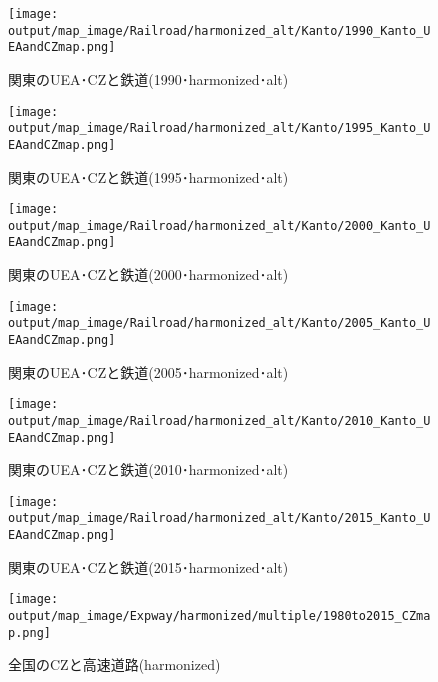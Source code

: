 \documentclass{ltjsarticle}
\begin{document}
\begin{figure}[pbth]
  \centering
  \texttt{[image: output/map\_image/Railroad/harmonized\_alt/Kanto/1990\_Kanto\_UEAandCZmap.png]}
  \caption{\label{altham:1990:KanCZandUEA:Rail}関東のUEA･CZと鉄道(1990･harmonized･alt)}
\end{figure}


\begin{figure}[pbth]
  \centering
  \texttt{[image: output/map\_image/Railroad/harmonized\_alt/Kanto/1995\_Kanto\_UEAandCZmap.png]}
  \caption{\label{altham:1995:KanCZandUEA:Rail}関東のUEA･CZと鉄道(1995･harmonized･alt)}
\end{figure}


\begin{figure}[pbth]
  \centering
  \texttt{[image: output/map\_image/Railroad/harmonized\_alt/Kanto/2000\_Kanto\_UEAandCZmap.png]}
  \caption{\label{altham:2000:KanCZandUEA:Rail}関東のUEA･CZと鉄道(2000･harmonized･alt)}
\end{figure}


\begin{figure}[pbth]
  \centering
  \texttt{[image: output/map\_image/Railroad/harmonized\_alt/Kanto/2005\_Kanto\_UEAandCZmap.png]}
  \caption{\label{altham:2005:KanCZandUEA:Rail}関東のUEA･CZと鉄道(2005･harmonized･alt)}
\end{figure}


\begin{figure}[pbth]
  \centering
  \texttt{[image: output/map\_image/Railroad/harmonized\_alt/Kanto/2010\_Kanto\_UEAandCZmap.png]}
  \caption{\label{altham:2010:KanCZandUEA:Rail}関東のUEA･CZと鉄道(2010･harmonized･alt)}
\end{figure}


\begin{figure}[pbth]
  \centering
  \texttt{[image: output/map\_image/Railroad/harmonized\_alt/Kanto/2015\_Kanto\_UEAandCZmap.png]}
  \caption{\label{altham:2015:KanCZandUEA:Rail}関東のUEA･CZと鉄道(2015･harmonized･alt)}
\end{figure}

\clearpage

\begin{figure}[pbth]
  \centering
  \texttt{[image: output/map\_image/Expway/harmonized/multiple/1980to2015\_CZmap.png]}
  \caption{\label{ham:allCZandExpway}全国のCZと高速道路(harmonized)}
\end{figure}
\end{document}
